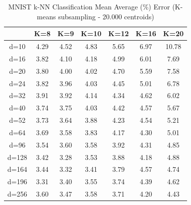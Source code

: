 \begin{table}[H]
\centering
\label{tab:table7}
\begin{tabular}{|c|c|c|c|c|c|c|}
\hline
& K=8 & K=9 & K=10 & K=12 & K=16 & K=20 \\
\hline
d=10 & 4.29 & 4.52 & 4.83 & 5.65 & 6.97 & 10.78 \\
d=16 & 3.82 & 4.10 & 4.18 & 4.99 & 6.01 & 7.69 \\
d=20 & 3.80 & 4.00 & 4.02 & 4.70 & 5.59 & 7.58 \\
d=24 & 3.82 & 3.96 & 4.03 & 4.45 & 5.01 & 6.78 \\
d=32 & 3.91 & 3.92 & 4.14 & 4.34 & 4.62 & 6.02 \\
d=40 & 3.74 & 3.75 & 4.03 & 4.42 & 4.57 & 5.67 \\
d=52 & 3.73 & 3.64 & 3.88 & 4.23 & 4.54 & 5.21 \\
d=64 & 3.69 & 3.58 & 3.83 & 4.17 & 4.30 & 5.01 \\
d=96 & 3.54 & 3.60 & 3.58 & 3.92 & 4.31 & 4.85 \\
d=128 & 3.42 & 3.28 & 3.53 & 3.88 & 4.18 & 4.88 \\
d=164 & 3.44 & 3.32 & 3.41 & 3.79 & 4.57 & 4.74 \\
d=196 & 3.31 & 3.40 & 3.55 & 3.74 & 4.39 & 4.62 \\
d=256 & 3.60 & 3.47 & 3.58 & 3.71 & 4.20 & 4.43 \\
\hline
\end{tabular}
\caption{MNIST k-NN Classification Mean Average (\%) Error (K-means subsampling - 20.000 centroids)}
\end{table}

